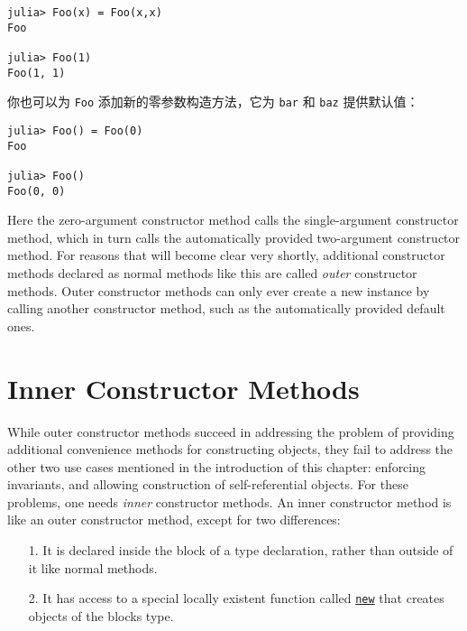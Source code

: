 \begin{verbatim}
julia> Foo(x) = Foo(x,x)
Foo

julia> Foo(1)
Foo(1, 1)
\end{verbatim}



你也可以为 \texttt{Foo} 添加新的零参数构造方法，它为 \texttt{bar} 和 \texttt{baz} 提供默认值：




\begin{verbatim}
julia> Foo() = Foo(0)
Foo

julia> Foo()
Foo(0, 0)
\end{verbatim}



Here the zero-argument constructor method calls the single-argument constructor method, which in turn calls the automatically provided two-argument constructor method. For reasons that will become clear very shortly, additional constructor methods declared as normal methods like this are called \emph{outer} constructor methods. Outer constructor methods can only ever create a new instance by calling another constructor method, such as the automatically provided default ones.



\hypertarget{3020780065533340945}{}


\section{Inner Constructor Methods}



While outer constructor methods succeed in addressing the problem of providing additional convenience methods for constructing objects, they fail to address the other two use cases mentioned in the introduction of this chapter: enforcing invariants, and allowing construction of self-referential objects. For these problems, one needs \emph{inner} constructor methods. An inner constructor method is like an outer constructor method, except for two differences:



\begin{itemize}
\item[1. ] It is declared inside the block of a type declaration, rather than outside of it like normal methods.


\item[2. ] It has access to a special locally existent function called \hyperlink{13888762393600028594}{\texttt{new}} that creates objects of the block{\textquotesingle}s type.

\end{itemize}


